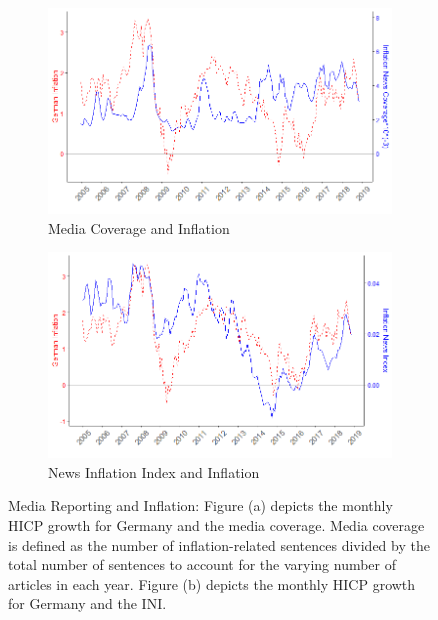 \documentclass[review]{elsarticle}
\begin{document}
   \begin{figure}[h!]
    \centering
\begin{subfigure}{6cm}
    \includegraphics{Inflation_Count.png}
    \caption{Media Coverage and Inflation}
    \label{10}
\end{subfigure}
\hfil
\begin{subfigure}{6cm}
    \includegraphics{Inflation_Sentiment_Direction.png}
    \caption{News Inflation Index and Inflation}
    \label{100}
\end{subfigure}
\caption{Media Reporting and Inflation: Figure (a) depicts the monthly HICP growth for Germany and the media coverage. Media coverage is defined as the number of inflation-related sentences divided by the total number of sentences to account for the varying number of articles in each year. Figure (b) depicts the monthly HICP growth for Germany and the INI.}
\label{fig:News Index}
    \end{figure}
\end{document}
